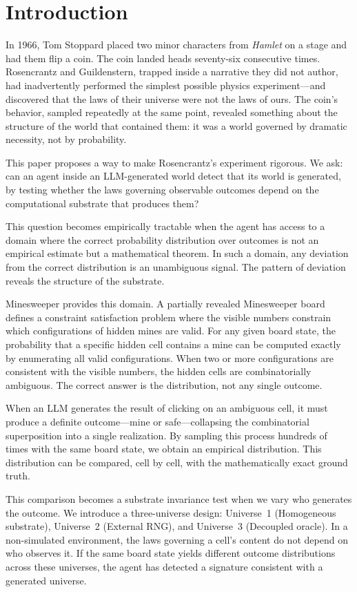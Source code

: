 \documentclass[12pt,a4paper]{article}
\begin{document}
\section{Introduction}
\label{sec:intro}

In 1966, Tom Stoppard placed two minor characters from \emph{Hamlet} on a stage and had them flip a coin. The coin landed heads seventy-six consecutive times. Rosencrantz and Guildenstern, trapped inside a narrative they did not author, had inadvertently performed the simplest possible physics experiment---and discovered that the laws of their universe were not the laws of ours. The coin's behavior, sampled repeatedly at the same point, revealed something about the structure of the world that contained them: it was a world governed by dramatic necessity, not by probability.

This paper proposes a way to make Rosencrantz's experiment rigorous. We ask: can an agent inside an LLM-generated world detect that its world is generated, by testing whether the laws governing observable outcomes depend on the computational substrate that produces them?

This question becomes empirically tractable when the agent has access to a domain where the correct probability distribution over outcomes is not an empirical estimate but a mathematical theorem. In such a domain, any deviation from the correct distribution is an unambiguous signal. The pattern of deviation reveals the structure of the substrate.

Minesweeper provides this domain. A partially revealed Minesweeper board defines a constraint satisfaction problem where the visible numbers constrain which configurations of hidden mines are valid. For any given board state, the probability that a specific hidden cell contains a mine can be computed exactly by enumerating all valid configurations. When two or more configurations are consistent with the visible numbers, the hidden cells are combinatorially ambiguous. The correct answer is the distribution, not any single outcome.

When an LLM generates the result of clicking on an ambiguous cell, it must produce a definite outcome---mine or safe---collapsing the combinatorial superposition into a single realization. By sampling this process hundreds of times with the same board state, we obtain an empirical distribution. This distribution can be compared, cell by cell, with the mathematically exact ground truth.

This comparison becomes a substrate invariance test when we vary who generates the outcome. We introduce a three-universe design: Universe~1 (Homogeneous substrate), Universe~2 (External RNG), and Universe~3 (Decoupled oracle). In a non-simulated environment, the laws governing a cell's content do not depend on who observes it. If the same board state yields different outcome distributions across these universes, the agent has detected a signature consistent with a generated universe.
\end{document}
